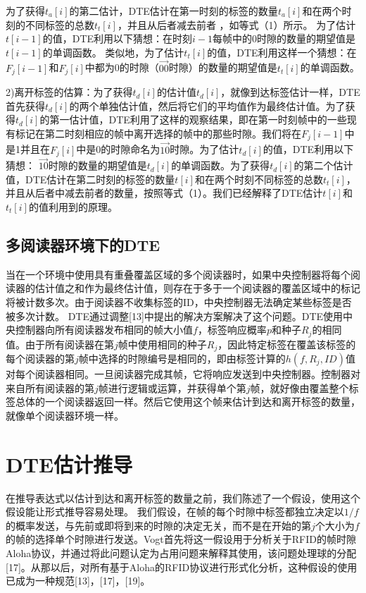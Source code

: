 \documentclass[UTF8]{ctexart}
\begin{document}
	为了获得$t_a[i]$的第二估计，DTE估计在第一时刻的标签的数量$t_a[i]$和在两个时刻的不同标签的总数$t_t[i]$，并且从后者减去前者 ，如等式（1）所示。 为了估计$t[i-1]$的值，DTE利用以下猜想：在时刻$i-1$每帧中的0时隙的数量的期望值是$t[i-1]$的单调函数。 类似地，为了估计$t_t[i]$的值，DTE利用这样一个猜想：在$F_j[i-1]$和$F_j[i]$中都为0的时隙（$\overrightarrow{00}$时隙）的数量的期望值是$t_t[i]$的单调函数。
	
	2)离开标签的估算：为了获得$t_d[i]$的估计值$t_d[i]$，就像到达标签估计一样，DTE首先获得$t_d[i]$的两个单独估计值，然后将它们的平均值作为最终估计值。为了获得$t_d[i]$的第一估计值，DTE利用了这样的观察结果，即在第一时刻帧中的一些现有标记在第二时刻相应的帧中离开选择的帧中的那些时隙。我们将在$F_j[i-1]$中是1并且在$F_j[i]$中是0的时隙命名为$\overrightarrow{10}$时隙。为了估计$t_d[i]$的值，DTE利用以下猜想： $\overrightarrow{10}$时隙的数量的期望值是$t_d[i]$的单调函数。为了获得$t_d[i]$的第二个估计值，DTE估计在第二时刻的标签的数量$t[i]$和在两个时刻不同标签的总数$t_t[i]$，并且从后者中减去前者的数量，按照等式（1）。我们已经解释了DTE估计$t[i]$和$t_t[i]$的值利用到的原理。
	
	\subsection{多阅读器环境下的DTE}
	当在一个环境中使用具有重叠覆盖区域的多个阅读器时，如果中央控制器将每个阅读器的估计值之和作为最终估计值，则存在于多于一个阅读器的覆盖区域中的标记将被计数多次。由于阅读器不收集标签的ID，中央控制器无法确定某些标签是否被多次计数。 DTE通过调整[13]中提出的解决方案解决了这个问题。DTE使用中央控制器向所有阅读器发布相同的帧大小值$f$，标签响应概率$p$和种子$R_j$的相同值。由于所有阅读器在第$j$帧中使用相同的种子$R_j$，因此特定标签在覆盖该标签的每个阅读器的第$j$帧中选择的时隙编号是相同的，即由标签计算的$h(f,R_j,ID)$值对每个阅读器相同。一旦阅读器完成其帧，它将响应发送到中央控制器。控制器对来自所有阅读器的第$j$帧进行逻辑或运算，并获得单个第$j$帧，就好像由覆盖整个标签总体的一个阅读器返回一样。然后它使用这个帧来估计到达和离开标签的数量，就像单个阅读器环境一样。
	
	\section{DTE估计推导}
	在推导表达式以估计到达和离开标签的数量之前，我们陈述了一个假设，使用这个假设能让形式推导容易处理。 我们假设，在帧的每个时隙中标签都独立决定以$1/f$的概率发送，与先前或即将到来的时隙的决定无关，而不是在开始的第$j$个大小为$f$的帧的选择单个时隙进行发送。Vogt首先将这一假设用于分析关于RFID的帧时隙Aloha协议，并通过将此问题认定为占用问题来解释其使用，该问题处理球的分配[17]。从那以后，对所有基于Aloha的RFID协议进行形式化分析，这种假设的使用已成为一种规范[13]，[17]，[19]。
	
\end{document}

